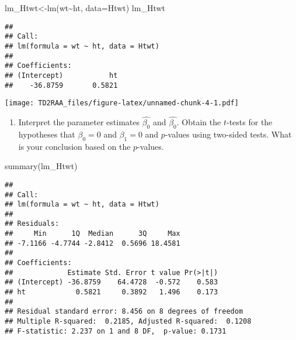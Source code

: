 \documentclass[
]{article}
\newenvironment{Shaded}{\begin{snugshade}}{\end{snugshade}}
\newcommand{\AttributeTok}[1]{\textcolor[rgb]{0.77,0.63,0.00}{#1}}
\newcommand{\FunctionTok}[1]{\textcolor[rgb]{0.00,0.00,0.00}{#1}}
\newcommand{\NormalTok}[1]{#1}
\newcommand{\OtherTok}[1]{\textcolor[rgb]{0.56,0.35,0.01}{#1}}
\newcommand{\SpecialCharTok}[1]{\textcolor[rgb]{0.00,0.00,0.00}{#1}}
\providecommand{\tightlist}{%
  \setlength{\itemsep}{0pt}\setlength{\parskip}{0pt}}
\begin{document}
\begin{Shaded}
\begin{Highlighting}[]
\NormalTok{lm\_Htwt}\OtherTok{\textless{}{-}}\FunctionTok{lm}\NormalTok{(wt}\SpecialCharTok{\textasciitilde{}}\NormalTok{ht, }\AttributeTok{data=}\NormalTok{Htwt)}
\NormalTok{lm\_Htwt}
\end{Highlighting}
\end{Shaded}

\begin{verbatim}
## 
## Call:
## lm(formula = wt ~ ht, data = Htwt)
## 
## Coefficients:
## (Intercept)           ht  
##    -36.8759       0.5821
\end{verbatim}

\begin{Shaded}
\end{Shaded}

\texttt{[image: TD2RAA\_files/figure-latex/unnamed-chunk-4-1.pdf]}

\begin{enumerate}
\def\labelenumi{\alph{enumi}.}
\setcounter{enumi}{2}
\tightlist
\item
  Interpret the parameter estimates \(\hat{\beta_0}\) and
  \(\hat{\beta_0}\). Obtain the \(t\)-tests for the hypotheses that
  \(\beta_0=0\) and \(\beta_1=0\) and \(p\)-values using two-sided
  tests. What is your conclusion based on the \(p\)-values.
\end{enumerate}

\begin{Shaded}
\begin{Highlighting}[]
\FunctionTok{summary}\NormalTok{(lm\_Htwt)}
\end{Highlighting}
\end{Shaded}

\begin{verbatim}
## 
## Call:
## lm(formula = wt ~ ht, data = Htwt)
## 
## Residuals:
##     Min      1Q  Median      3Q     Max 
## -7.1166 -4.7744 -2.8412  0.5696 18.4581 
## 
## Coefficients:
##             Estimate Std. Error t value Pr(>|t|)
## (Intercept) -36.8759    64.4728  -0.572    0.583
## ht            0.5821     0.3892   1.496    0.173
## 
## Residual standard error: 8.456 on 8 degrees of freedom
## Multiple R-squared:  0.2185, Adjusted R-squared:  0.1208 
## F-statistic: 2.237 on 1 and 8 DF,  p-value: 0.1731
\end{verbatim}
\end{document}
